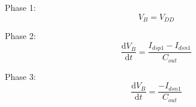 \documentclass{article}
\begin{document}
\title{}
\author{}
\date{}
\maketitle

Phase 1: $$V_B=V_{DD}$$

Phase 2: $$\frac{\mathrm{d} V_B}{\mathrm{d} t}=\frac{I_{dsp1}-I_{dsn1}}{C_{out}}$$

Phase 3: $$\frac{\mathrm{d} V_B}{\mathrm{d} t}=\frac{-I_{dsn1}}{C_{out}}$$
\end{document}
